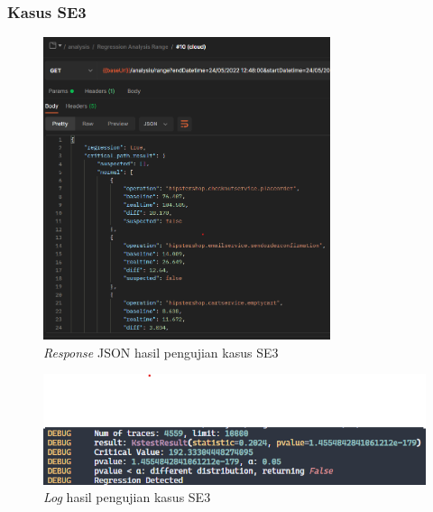 \subsubsection{Kasus SE3}
\begin{figure}[!htb]
	\centering
	\includegraphics[width=0.75\textwidth]{resources/ch4/json/10.png}
	\caption{\textit{Response} JSON hasil pengujian kasus SE3}
	\label{result_json_10}
\end{figure}
\begin{figure}[!htb]
	\centering
	\includegraphics[width=1\textwidth]{resources/ch4/log/10-log.png}
	\caption{\textit{Log} hasil pengujian kasus SE3}
	\label{result_log_10}
\end{figure}
\pagebreak

